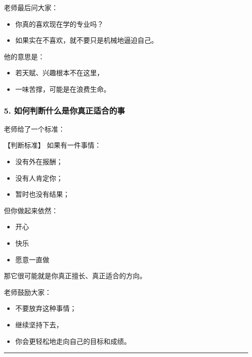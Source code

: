 \documentclass[
  chinese,
  9pt,
  a4paper,
]{ctexart}
\providecommand{\tightlist}{%
  \setlength{\itemsep}{0pt}\setlength{\parskip}{0pt}}
\begin{document}
老师最后问大家：

\begin{itemize}
\tightlist
\item
  你真的喜欢现在学的专业吗？
\item
  如果实在不喜欢，就不要只是机械地逼迫自己。
\end{itemize}

他的意思是：

\begin{itemize}
\tightlist
\item
  若天赋、兴趣根本不在这里，
\item
  一味苦撑，可能是在浪费生命。
\end{itemize}

\subsubsection{5.
如何判断什么是你真正适合的事}\label{ux5982ux4f55ux5224ux65adux4ec0ux4e48ux662fux4f60ux771fux6b63ux9002ux5408ux7684ux4e8b}

老师给了一个标准：

【判断标准】 如果有一件事情：

\begin{itemize}
\tightlist
\item
  没有外在报酬；
\item
  没有人肯定你；
\item
  暂时也没有结果；
\end{itemize}

但你做起来依然：

\begin{itemize}
\tightlist
\item
  开心
\item
  快乐
\item
  愿意一直做
\end{itemize}

那它很可能就是你真正擅长、真正适合的方向。

老师鼓励大家：

\begin{itemize}
\tightlist
\item
  不要放弃这种事情；
\item
  继续坚持下去，
\item
  你会更轻松地走向自己的目标和成绩。
\end{itemize}

\begin{center}\rule{0.5\linewidth}{0.5pt}\end{center}
\end{document}
